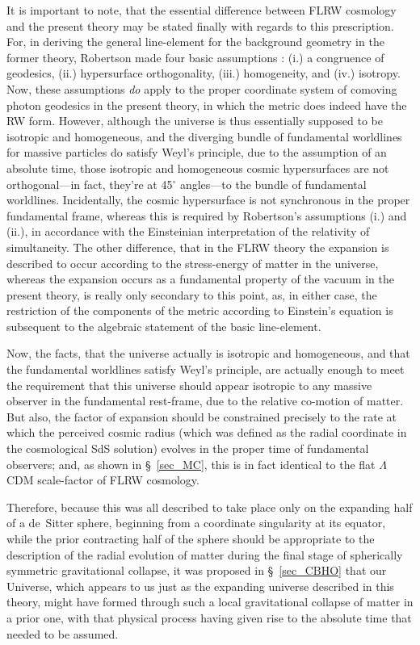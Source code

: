 It is important to note, that the essential difference between FLRW cosmology and the present theory may be stated finally with regards to this prescription. For, in deriving the general line-element for the background geometry in the former theory, Robertson made four basic assumptions \cite{Rugh2010}: (i.) a congruence of geodesics, (ii.) hypersurface orthogonality, (iii.) homogeneity, and (iv.) isotropy. Now, these assumptions \textit{do} apply to the proper coordinate system of comoving photon geodesics in the present theory, in which the metric does indeed have the RW form. However, although the universe is thus essentially supposed to be isotropic and homogeneous, and the diverging bundle of fundamental worldlines for massive particles do satisfy Weyl's principle, due to the assumption of an absolute time, those isotropic and homogeneous cosmic hypersurfaces are not orthogonal---in fact, they're at 45$^{\circ}$ angles---to the bundle of fundamental worldlines. Incidentally, the cosmic hypersurface is not synchronous in the proper fundamental frame, whereas this is required by Robertson's assumptions (i.) and (ii.), in accordance with the Einsteinian interpretation of the relativity of simultaneity. The other difference, that in the FLRW theory the expansion is described to occur according to the stress-energy of matter in the universe, whereas the expansion occurs as a fundamental property of the vacuum in the present theory, is really only secondary to this point, as, in either case, the restriction of the components of the metric according to Einstein's equation is subsequent to the algebraic statement of the basic line-element.  

Now, the facts, that the universe actually is isotropic and homogeneous, and that the fundamental worldlines satisfy Weyl's principle, are actually enough to meet the requirement that this universe should appear isotropic to any massive observer in the fundamental rest-frame, due to the relative co-motion of matter. But also, the factor of expansion should be constrained precisely to the rate at which the perceived cosmic radius (which was defined as the radial coordinate in the cosmological SdS solution) evolves in the proper time of fundamental observers; and, as shown in \S~\ref{sec_MC}, this is in fact identical to the flat $\Lambda$CDM scale-factor of FLRW cosmology.

Therefore, because this was all described to take place only on the expanding half of a de~Sitter sphere, beginning from a coordinate singularity at its equator, while the prior contracting half of the sphere should be appropriate to the description of the radial evolution of matter during the final stage of spherically symmetric gravitational collapse, it was proposed in \S~\ref{sec_CBHO} that our Universe, which appears to us just as the expanding universe described in this theory, might have formed through such a local gravitational collapse of matter in a prior one, with that physical process having given rise to the absolute time that needed to be assumed.







